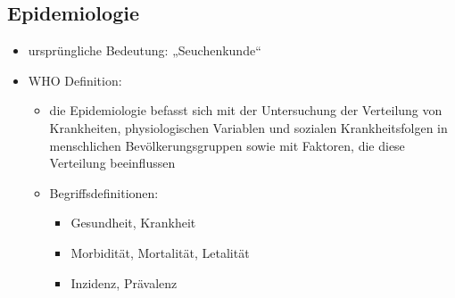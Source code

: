 \subsection{Epidemiologie}
	\begin{itemize}
		\item ursprüngliche Bedeutung: „Seuchenkunde“
		\item WHO Definition:
			\begin{itemize}
				\item die Epidemiologie befasst sich mit der Untersuchung der Verteilung von Krankheiten, physiologischen Variablen und sozialen Krankheitsfolgen in menschlichen Bevölkerungsgruppen sowie mit Faktoren, die diese Verteilung beeinflussen
				\item Begriffsdefinitionen:
					\begin{itemize}
						\item Gesundheit, Krankheit
						\item Morbidität, Mortalität, Letalität
						\item Inzidenz, Prävalenz
					\end{itemize}
		\end{itemize}
	\end{itemize}

